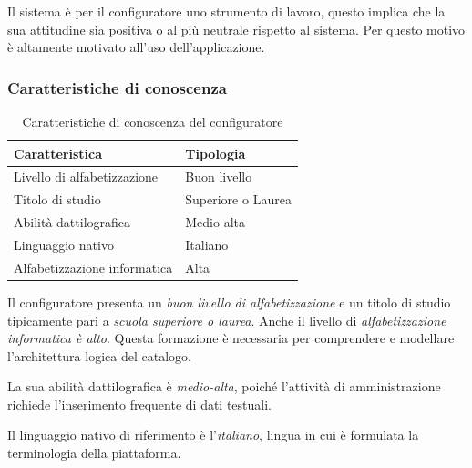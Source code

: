 Il sistema è per il configuratore uno strumento di lavoro, questo implica che la sua attitudine sia positiva o al più neutrale rispetto al sistema. Per questo motivo è altamente motivato all'uso dell'applicazione.

\subsubsection{Caratteristiche di conoscenza}
\begin{table}[H]
    \centering
    \begin{tabular}{@{}>{\raggedright\arraybackslash}p{8cm}>{\raggedright\arraybackslash}p{4cm}@{}}
        \toprule
        \textbf{Caratteristica}      & \textbf{Tipologia} \\ \midrule
        Livello di alfabetizzazione  & Buon livello       \\
        Titolo di studio             & Superiore o Laurea \\
        Abilità dattilografica       & Medio-alta         \\
        Linguaggio nativo            & Italiano           \\
        Alfabetizzazione informatica & Alta               \\ \bottomrule
    \end{tabular}
    \caption{Caratteristiche di conoscenza del configuratore}
\end{table}

Il configuratore presenta un \emph{buon livello di alfabetizzazione} e un titolo di studio tipicamente pari a \emph{scuola superiore o laurea}. Anche il livello di \emph{alfabetizzazione informatica è alto}. Questa formazione è necessaria per comprendere e modellare l'architettura logica del catalogo.

La sua abilità dattilografica è \emph{medio-alta}, poiché l'attività di amministrazione richiede l'inserimento frequente di dati testuali.

Il linguaggio nativo di riferimento è l'\emph{italiano}, lingua in cui è formulata la terminologia della piattaforma.


